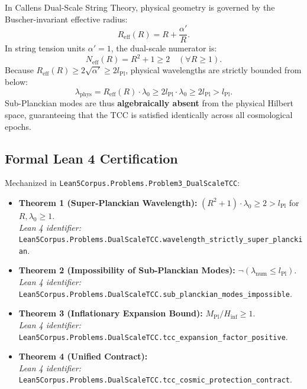 \documentclass[11pt,a4paper]{article}
\begin{document}
In Callens Dual-Scale String Theory, physical geometry is governed by the Buscher-invariant effective radius:
\begin{equation}
    R_{\mathrm{eff}}(R) = R + \frac{\alpha'}{R}.
\end{equation}
In string tension units $\alpha' = 1$, the dual-scale numerator is:
\begin{equation}
    N_{\mathrm{eff}}(R) = R^2 + 1 \ge 2 \quad (\forall R \ge 1).
\end{equation}
Because $R_{\mathrm{eff}}(R) \ge 2 \sqrt{\alpha'} \ge 2 l_{\mathrm{Pl}}$, physical wavelengths are strictly bounded from below:
\begin{equation}
    \lambda_{\mathrm{phys}} = R_{\mathrm{eff}}(R) \cdot \lambda_0 \ge 2 l_{\mathrm{Pl}} \cdot \lambda_0 \ge 2 l_{\mathrm{Pl}} > l_{\mathrm{Pl}}.
\end{equation}
Sub-Planckian modes are thus \textbf{algebraically absent} from the physical Hilbert space, guaranteeing that the TCC is satisfied identically across all cosmological epochs.

\subsection{Formal Lean 4 Certification}
Mechanized in \texttt{Lean5Corpus.Problems.Problem3\_DualScaleTCC}:
\begin{itemize}
    \item \textbf{Theorem 1 (Super-Planckian Wavelength):} $(R^2 + 1) \cdot \lambda_0 \ge 2 > l_{\mathrm{Pl}}$ for $R, \lambda_0 \ge 1$. \\
    \textit{Lean 4 identifier:} \texttt{Lean5Corpus.Problems.DualScaleTCC.wavelength\_strictly\_super\_planckian}.
    \item \textbf{Theorem 2 (Impossibility of Sub-Planckian Modes):} $\neg(\lambda_{\mathrm{num}} \le l_{\mathrm{Pl}})$. \\
    \textit{Lean 4 identifier:} \texttt{Lean5Corpus.Problems.DualScaleTCC.sub\_planckian\_modes\_impossible}.
    \item \textbf{Theorem 3 (Inflationary Expansion Bound):} $M_{\mathrm{Pl}} / H_{\mathrm{inf}} \ge 1$. \\
    \textit{Lean 4 identifier:} \texttt{Lean5Corpus.Problems.DualScaleTCC.tcc\_expansion\_factor\_positive}.
    \item \textbf{Theorem 4 (Unified Contract):} \\
    \textit{Lean 4 identifier:} \texttt{Lean5Corpus.Problems.DualScaleTCC.tcc\_cosmic\_protection\_contract}.
\end{itemize}
\end{document}
